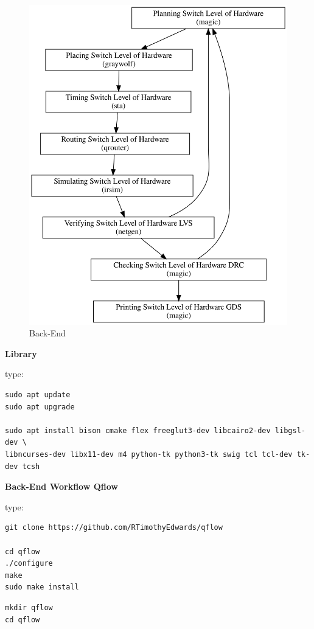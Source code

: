 \documentclass[
]{article}
\begin{document}
\begin{figure}
\centering
\includegraphics{../doc/back-end.svg}
\caption{Back-End}
\end{figure}

\textbf{Library}

type:

\begin{verbatim}
sudo apt update
sudo apt upgrade

sudo apt install bison cmake flex freeglut3-dev libcairo2-dev libgsl-dev \
libncurses-dev libx11-dev m4 python-tk python3-tk swig tcl tcl-dev tk-dev tcsh
\end{verbatim}

\textbf{Back-End Workflow Qflow}

type:

\begin{verbatim}
git clone https://github.com/RTimothyEdwards/qflow

cd qflow
./configure
make
sudo make install
\end{verbatim}

\begin{verbatim}
mkdir qflow
cd qflow
\end{verbatim}
\end{document}
